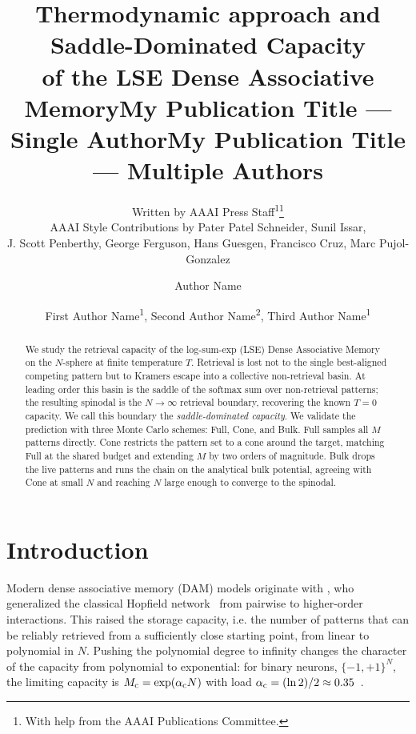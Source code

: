\documentclass[letterpaper]{article} %
\title{\bfseries Thermodynamic approach and Saddle-Dominated Capacity
\\of the LSE Dense Associative Memory}
\author{
    Written by AAAI Press Staff\textsuperscript{\rm 1}\thanks{With help from the AAAI Publications Committee.}\\
    AAAI Style Contributions by Pater Patel Schneider,
    Sunil Issar,\\
    J. Scott Penberthy,
    George Ferguson,
    Hans Guesgen,
    Francisco Cruz\equalcontrib,
    Marc Pujol-Gonzalez\equalcontrib
}
\title{My Publication Title --- Single Author}
\author {
    Author Name
}
\title{My Publication Title --- Multiple Authors}
\author {
    First Author Name\textsuperscript{\rm 1},
    Second Author Name\textsuperscript{\rm 2},
    Third Author Name\textsuperscript{\rm 1}
}
\begin{document}
\maketitle

\begin{abstract}
We study the retrieval capacity of the log-sum-exp (LSE) Dense Associative Memory on the $N$-sphere at finite temperature $T$. Retrieval is lost not to the single best-aligned competing pattern but to Kramers escape into a collective non-retrieval basin. At leading order this basin is the saddle of the softmax sum over non-retrieval patterns; the resulting spinodal is the $N \to \infty$ retrieval boundary, recovering the known $T = 0$ capacity. We call this boundary the \textit{saddle-dominated capacity}. We validate the prediction with three Monte Carlo schemes: Full, Cone, and Bulk. Full samples all $M$ patterns directly. Cone restricts the pattern set to a cone around the target, matching Full at the shared budget and extending $M$ by two orders of magnitude. Bulk drops the live patterns and runs the chain on the analytical bulk potential, agreeing with Cone at small $N$ and reaching $N$ large enough to converge to the spinodal. 
\end{abstract}






\section{Introduction}

Modern dense associative memory (DAM) models originate with \citet{krotov2016dense}, who generalized the classical Hopfield network~\citep{Hopfield1982} from pairwise to higher-order interactions. This raised the storage capacity, i.e. the number of patterns that can be reliably retrieved from a sufficiently close starting point, from linear to polynomial in $N$. Pushing the polynomial degree to infinity changes the character of the capacity from polynomial to exponential: for binary neurons, $\{-1,+1\}^{N}$, the limiting capacity is $M_{\rm c} = \exp(\alpha_{\rm c} N)$ with load $\alpha_{\rm c} = (\ln 2)/2 \approx 0.35$~\citep{demircigil2017model}.
\end{document}

